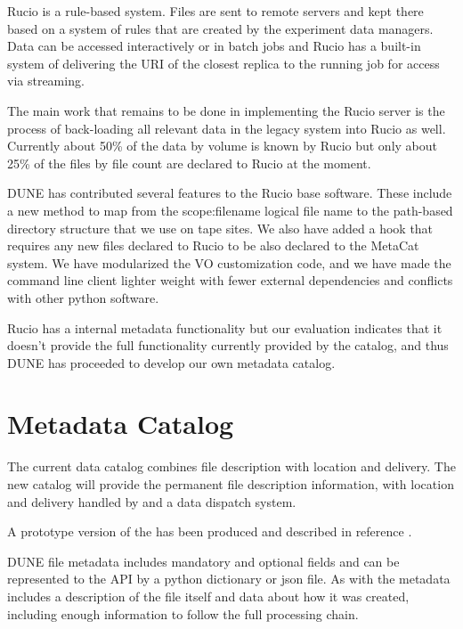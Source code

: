 \documentclass[../main-v1.tex]{subfiles}
\begin{document}
Rucio is a rule-based system.  Files are sent to remote servers and kept there based on a system of rules
that are created by the experiment data managers.  Data can be accessed interactively or in batch jobs and
Rucio has a built-in system of delivering the URI of the closest replica to the running job for access via streaming.

The main work that remains to be done in implementing the Rucio server is the process of back-loading all relevant 
data in the legacy  system into Rucio as well.  Currently about 50\% of the data by volume is known by Rucio but only about 25\% of the files by file count are declared to Rucio at the moment. 

DUNE has contributed several features to the Rucio base software.  These include a new method to map from the scope:filename logical file name to the path-based directory structure that we use on tape sites.  We also have added a hook that requires any new files declared to Rucio to be also declared to the MetaCat system.  We have modularized the VO customization code, and we have made the command line client lighter weight with fewer external dependencies and conflicts with other python software. 

Rucio has a internal metadata functionality but our evaluation indicates that it doesn't provide the full functionality currently provided by the  catalog, and thus DUNE has proceeded to develop our own metadata catalog. 

\section{Metadata Catalog}

The current  data catalog combines file description with location and delivery.  The new  catalog will provide the permanent file description information, with location and delivery handled by  and a data dispatch system. 

A prototype version of the  has been produced and described in reference \cite{Mandrichenko:2021spd}. 

DUNE file metadata includes mandatory and optional fields and can be represented to the API by a python dictionary or json file. 
As with  the metadata includes a description of the file itself and data about how it was created, including enough information to follow the full processing chain.   
\end{document}
